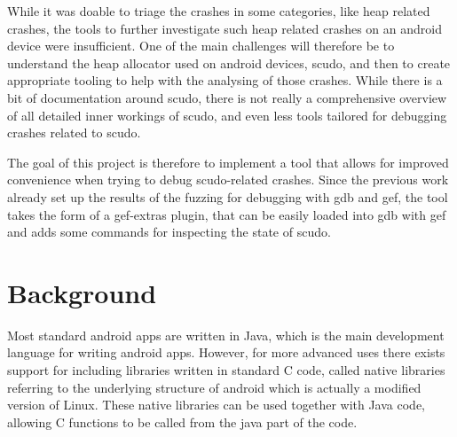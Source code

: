 \documentclass[a4paper,11pt,oneside]{report}
\begin{document}
While it was doable to triage the crashes in some categories, like heap related
crashes, the tools to further investigate such heap related crashes on an
android device were insufficient. One of the main challenges will therefore be
to understand the heap allocator used on android devices, scudo, and then to
create appropriate tooling to help with the analysing of those crashes.
While there is a bit of documentation around scudo, there is not really a
comprehensive overview of all detailed inner workings of scudo, and even less
tools tailored for debugging crashes related to scudo.

The goal of this project is therefore to implement a tool that allows for
improved convenience when trying to debug scudo-related crashes. Since the
previous work already set up the results of the fuzzing for debugging with
gdb and gef, the tool takes the form of a gef-extras plugin, that can be
easily loaded into gdb with gef and adds some commands for inspecting the
state of scudo.

\chapter{Background}

Most standard android apps are written in Java, which is the main development
language for writing android apps. However, for more advanced uses there exists
support for including libraries written in standard C code, called native libraries
referring to the underlying structure of android which is actually a modified
version of Linux. These native libraries can be used together with Java code,
allowing C functions to be called from the java part of the code.
\end{document}
